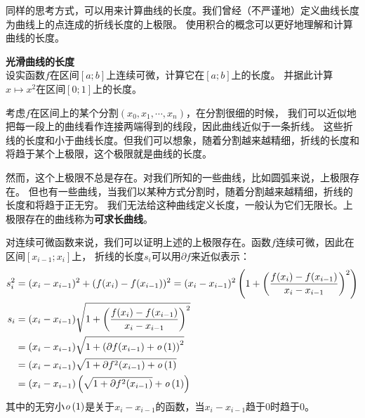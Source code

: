 \documentclass[12pt,UTF8]{ctexbook}
\begin{document}
同样的思考方式，可以用来计算曲线的长度。我们曾经（不严谨地）定义曲线长度为曲线上的点连成的折线长度的上极限。
使用积合的概念可以更好地理解和计算曲线的长度。

\begin{et}{\textbf{光滑曲线的长度}}\\
    设实函数$f$在区间$[a;b]$上连续可微，计算它在$[a;b]$上的长度。
    并据此计算$x\mapsto x^2$在区间$[0;1]$上的长度。    
\end{et}

\begin{so}
    考虑$f$在区间上的某个分割$(x_0, x_1, \cdots, x_n)$，在分割很细的时候，
    我们可以近似地把每一段上的曲线看作连接两端得到的线段，因此曲线近似于一条折线。
    这些折线的长度和小于曲线长度。但我们可以想象，随着分割越来越精细，折线的长度和将趋于某个上极限，这个极限就是曲线的长度。

    然而，这个上极限不总是存在。对我们所知的一些曲线，比如圆弧来说，上极限存在。
    但也有一些曲线，当我们以某种方式分割时，随着分割越来越精细，折线的长度和将趋于正无穷。
    我们无法给这种曲线定义长度，一般认为它们无限长。上极限存在的曲线称为\textbf{可求长曲线}。

    对连续可微函数来说，我们可以证明上述的上极限存在。函数$f$连续可微，因此在区间$[x_{i-1};x_i]$上，
    折线的长度$s_i$可以用$\partial f$来近似表示：
    \begin{align*}
        s_i^2 &= (x_i - x_{i-1})^2 + (f(x_i) - f(x_{i-1}))^2 = (x_i - x_{i-1})^2\left( 1 + \left(\frac{f(x_i) - f(x_{i-1})}{x_i - x_{i-1}}\right)^2\right) \\
        s_i &= (x_i - x_{i-1})\sqrt{1 + \left(\frac{f(x_i) - f(x_{i-1})}{x_i - x_{i-1}}\right)^2} \\
        &= (x_i - x_{i-1})\sqrt{1 + \left(\partial f(x_{i-1}) + \mathit{o}\left(1\right)\right)^2}\\
        &= (x_i - x_{i-1})\sqrt{1 + \partial f^2(x_{i-1}) + \mathit{o}\left(1\right)}\\
        &= (x_i - x_{i-1})\left(\sqrt{1 + \partial f^2(x_{i-1})} + \mathit{o}\left(1\right)\right)
    \end{align*}
    其中的无穷小$\mathit{o}\left(1\right)$是关于$x_i - x_{i-1}$的函数，当$x_i - x_{i-1}$趋于$0$时趋于$0$。


\end{so}
\end{document}
